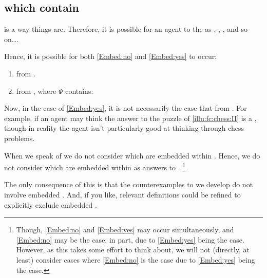 \subsection*{ which contain }


\begin{note}
   is a way things are.
  Therefore, it is possible for an agent to \eval{} the \prop{}  as , , , and so on\dots.

  Hence, it is possible for both \ref{Embed:no} and \ref{Embed:yes} to occur:

  \begin{enumerate}[label=\arabic*., ref=(\arabic*)]
  \item
    \label{Embed:no}
     from .
  \item
    \label{Embed:yes}
     from , where \(\Psi\) contains:

  \end{enumerate}

  Now, in the case of \ref{Embed:yes}, it is not necessarily the case that  from .
  For example, if an agent may think the answer to the puzzle of \autoref{illu:fc:chess:II} is a \fc{}, though in reality the agent isn't particularly good at thinking through chess problems.

  When we speak of \fingfr{} we do not consider \fingfr{} which are embedded within \fingfr{}.
  Hence, we do not consider \fingfr{} which are embedded within \fingfr{} as answers to \qWhy{}.%
  \footnote{
    Though, \ref{Embed:no} and \ref{Embed:yes} may occur simultaneously, and \ref{Embed:no} may be the case, in part, due to \ref{Embed:yes} being the case.
    However, as this takes some effort to think about, we will not (directly, at least) consider cases where \ref{Embed:no} is the case due to \ref{Embed:yes} being the case.
  }

  The only consequence of this is that the counterexamples to \issueInclusion{} we develop do not involve embedded \fingfr{}.
  And, if you like, relevant definitions could be refined to explicitly exclude embedded .
\end{note}






